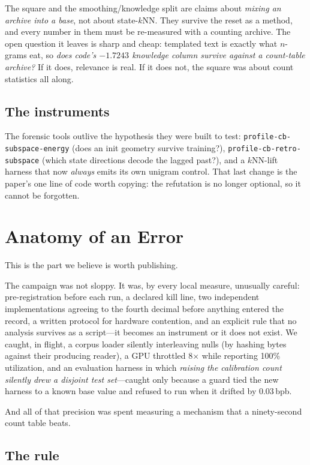 \documentclass[11pt,a4paper]{article}
\newcommand{\bpb}{\,bpb}
\begin{document}
The square and the smoothing/knowledge split are claims about \emph{mixing an
archive into a base}, not about state-$k$NN. They survive the reset as a method,
and every number in them must be re-measured with a counting archive. The open
question it leaves is sharp and cheap: templated text is exactly what $n$-grams
eat, so \emph{does code's $-1.7243$ knowledge column survive against a count-table
archive?} If it does, relevance is real. If it does not, the square was about count
statistics all along.

\subsection{The instruments}

The forensic tools outlive the hypothesis they were built to test:
\texttt{profile-cb-subspace-energy} (does an init geometry survive training?),
\texttt{profile-cb-retro-subspace} (which state directions decode the lagged
past?), and a $k$NN-lift harness that now \emph{always} emits its own unigram
control. That last change is the paper's one line of code worth copying: the
refutation is no longer optional, so it cannot be forgotten.

\section{Anatomy of an Error}
\label{sec:anatomy}

This is the part we believe is worth publishing.

The campaign was not sloppy. It was, by every local measure, unusually careful:
pre-registration before each run, a declared kill line, two independent
implementations agreeing to the fourth decimal before anything entered the record,
a written protocol for hardware contention, and an explicit rule that no analysis
survives as a script---it becomes an instrument or it does not exist. We caught, in
flight, a corpus loader silently interleaving nulls (by hashing bytes against their
producing reader), a GPU throttled 8$\times$ while reporting 100\% utilization, and
an evaluation harness in which \emph{raising the calibration count silently drew a
disjoint test set}---caught only because a guard tied the new harness to a known
base value and refused to run when it drifted by 0.03\bpb.

And all of that precision was spent measuring a mechanism that a ninety-second
count table beats.

\subsection{The rule}
\end{document}
